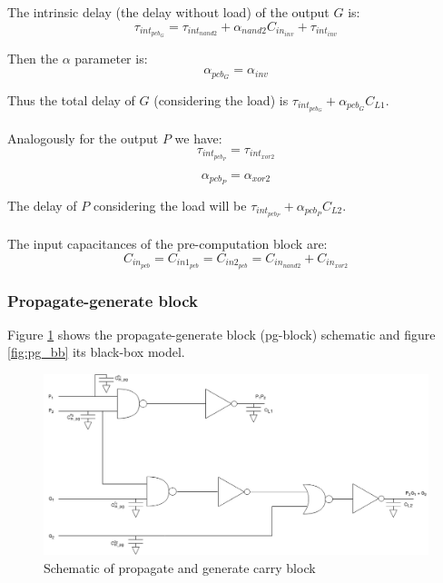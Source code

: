 The intrinsic delay (the delay without load) of the output $G$ is:
\begin{equation}
\tau_{int_{pcb_{G}}} = \tau_{int_{nand2}}+\alpha_{nand2}C_{in_{inv}}+\tau_{int_{inv}}
\end{equation}

Then the $\alpha$ parameter is:
\begin{equation}
\alpha_{pcb_{G}}=\alpha_{inv}
\end{equation}

Thus the total delay of $G$ (considering the load) is $\tau_{int_{pcb_{G}}}+\alpha_{pcb_{G}}C_{L1}$.\\\\

Analogously for the output $P$ we have:
\begin{equation}
\tau_{int_{pcb_{P}}} = \tau_{int_{xor2}}
\end{equation}

\begin{equation}
\alpha_{pcb_{P}}=\alpha_{xor2}
\end{equation}

The delay of $P$ considering the load will be $\tau_{int_{pcb_{P}}}+\alpha_{pcb_{P}}C_{L2}$.\\\\

The input capacitances of the pre-computation block are:
\begin{equation}
C_{in_{pcb}}=C_{in1_{pcb}}=C_{in2_{pcb}}=C_{in_{nand2}}+C_{in_{xor2}}
\end{equation}





\subsubsection{Propagate-generate block}
Figure \ref{fig:pg_block_schematic} shows the propagate-generate block (pg-block) schematic and figure \ref{fig:pg_bb} its black-box model.

\begin{figure}[H]
\centering
\includegraphics[width = \textwidth]{pentium/propagate_generate_block_schematic.png}
\caption{Schematic of propagate and generate carry block}
\label{fig:pg_block_schematic}
\end{figure}

